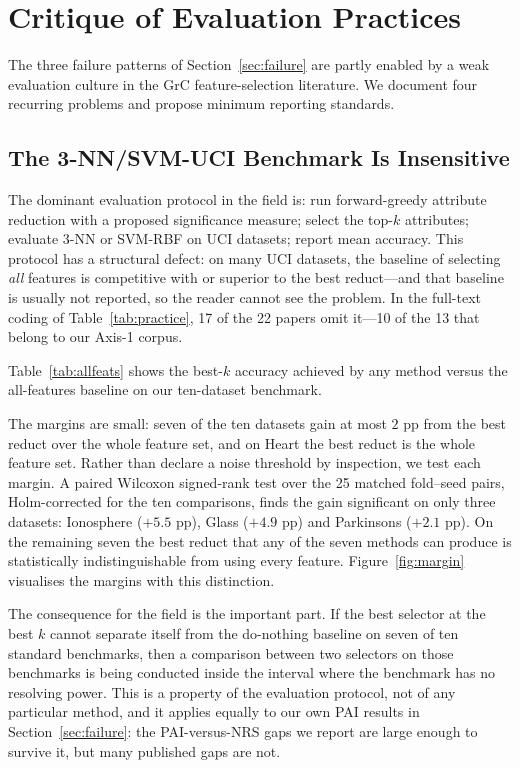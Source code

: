 \section{Critique of Evaluation Practices}
\label{sec:methodology}

The three failure patterns of Section~\ref{sec:failure} are partly enabled
by a weak evaluation culture in the GrC feature-selection literature.
We document four recurring problems and propose minimum reporting standards.

\subsection{The 3-NN/SVM-UCI Benchmark Is Insensitive}
\label{sec:insensitive}

The dominant evaluation protocol in the field is: run forward-greedy
attribute reduction with a proposed significance measure; select the top-$k$
attributes; evaluate 3-NN or SVM-RBF on UCI datasets; report mean accuracy.
This protocol has a structural defect: on many UCI datasets, the baseline
of selecting \emph{all} features is competitive with or superior to the best
reduct---and that baseline is usually not reported, so the reader cannot see
the problem.  In the full-text coding of Table~\ref{tab:practice}, 17 of the
22 papers omit it---10 of the 13 that belong to our Axis-1 corpus.

Table~\ref{tab:allfeats} shows the best-$k$ accuracy achieved by any method
versus the all-features baseline on our ten-dataset benchmark.



The margins are small: seven of the ten datasets gain at most $2$ pp from
the best reduct over the whole feature set, and on Heart the best reduct
is the whole feature set.  Rather than declare a noise threshold by
inspection, we test each margin.  A paired Wilcoxon signed-rank test over the
25 matched fold--seed pairs, Holm-corrected for the ten comparisons, finds
the gain significant on only three datasets: Ionosphere ($+5.5$ pp),
Glass ($+4.9$ pp) and Parkinsons ($+2.1$ pp).  On the remaining seven the
best reduct that any of the seven methods can produce is statistically
indistinguishable from using every feature.
Figure~\ref{fig:margin} visualises the margins with this distinction.

The consequence for the field is the important part.  If the best
selector at the best $k$ cannot separate itself from the do-nothing
baseline on seven of ten standard benchmarks, then a comparison between two
selectors on those benchmarks is being conducted inside the interval where
the benchmark has no resolving power.  This is a property of the evaluation
protocol, not of any particular method, and it applies equally to our own
PAI results in Section~\ref{sec:failure}: the PAI-versus-NRS gaps we report
are large enough to survive it, but many published gaps are not.

